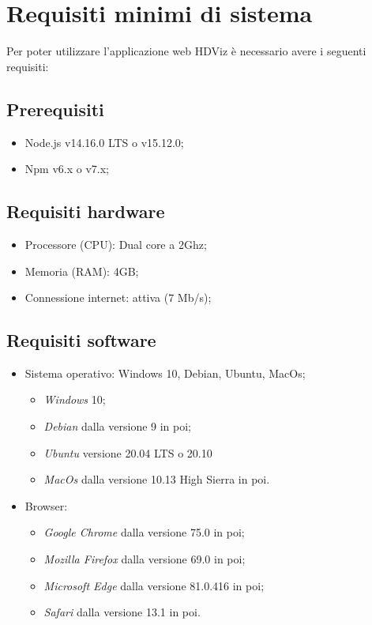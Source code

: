 \section{Requisiti minimi di sistema}
Per poter utilizzare l'applicazione web HDViz è necessario avere i seguenti requisiti:
\subsection{Prerequisiti}
\begin{itemize}
	\item Node.js v14.16.0 LTS o v15.12.0;
	\item Npm v6.x o v7.x;
\end{itemize}
\subsection{Requisiti hardware}
\begin{itemize}
	
	\item Processore (CPU): Dual core a 2Ghz;
	\item Memoria (RAM): 4GB;
	\item Connessione internet: attiva (7 Mb/s);
\end{itemize}

\subsection{Requisiti software}
\begin{itemize}
	\item Sistema operativo: Windows 10, Debian, Ubuntu, MacOs;
	\begin{itemize}
		\item  \textit{Windows} 10;
		\item \textit{Debian} dalla versione 9 in poi;
		\item \textit{Ubuntu} versione 20.04 LTS o 20.10
		\item \textit{MacOs} dalla versione 10.13 High Sierra in poi.
	\end{itemize}
	\item Browser: 
	\begin{itemize}
		\item  \textit{Google Chrome} dalla versione 75.0 in poi;
		\item \textit{Mozilla Firefox} dalla versione 69.0 in poi;
		\item \textit{Microsoft Edge} dalla versione 81.0.416 in poi;
		\item \textit{Safari} dalla versione 13.1 in poi.
	\end{itemize}	 
\end{itemize}
